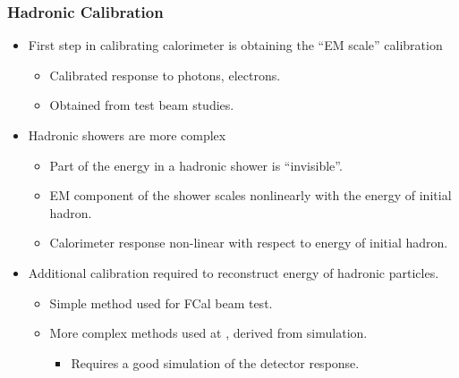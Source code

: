 \documentclass[10pt]{beamer}
\begin{document}
\begin{frame}\frametitle{Hadronic Calibration} 
\begin{itemize}
\item First step in calibrating calorimeter is obtaining the ``EM scale'' calibration
\begin{itemize}
\item Calibrated response to photons, electrons.
\item Obtained from test beam studies.
\end{itemize}
\item Hadronic showers are more complex
\begin{itemize}
\item Part of the energy in a hadronic shower is ``invisible''.
\item EM component of the shower scales nonlinearly with the energy of initial hadron.
\item Calorimeter response non-linear with respect to energy of initial hadron.
\end{itemize}
\item Additional calibration required to reconstruct energy of hadronic particles.
\begin{itemize}
\item Simple method used for FCal beam test. 
\item More complex methods used at \atlas, derived from simulation.
\begin{itemize}
\item Requires a good simulation of the detector response.
\end{itemize}
\end{itemize}
\end{itemize}

\end{frame}
\end{document}
